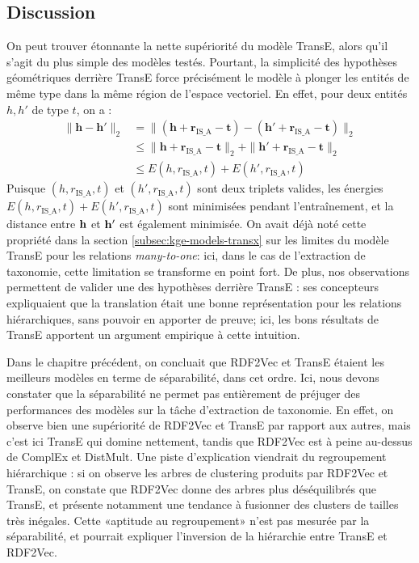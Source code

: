 \subsection{Discussion}
\label{subsec:te-discussion}


On peut trouver étonnante la nette supériorité du modèle TransE, alors qu'il s'agit du plus simple des modèles testés. Pourtant, la simplicité des hypothèses géométriques derrière TransE force précisément le modèle à plonger les entités de même type dans la même région de l'espace vectoriel. En effet, pour deux entités $h, h'$ de type $t$, on a :
\begin{align*}
    \| \mathbf{h} - \mathbf{h}'\|_2 &= \| (\mathbf{h} + \mathbf{r}_{\text{IS\_A}} - \mathbf{t}) - (\mathbf{h}' + \mathbf{r}_{\text{IS\_A}} - \mathbf{t}) \|_2 \\
        &\leq \| \mathbf{h} + \mathbf{r}_{\text{IS\_A}} - \mathbf{t} \|_2 +  \| \mathbf{h}' + \mathbf{r}_{\text{IS\_A}} - \mathbf{t} \|_2 \\
        &\leq E(h, r_{\text{IS\_A}}, t) + E(h', r_{\text{IS\_A}}, t)
\end{align*}
Puisque $(h, r_{\text{IS\_A}}, t)$ et $(h', r_{\text{IS\_A}}, t)$ sont deux triplets valides, les énergies $E(h, r_{\text{IS\_A}}, t) + E(h', r_{\text{IS\_A}}, t)$ sont minimisées pendant l'entraînement, et la distance entre $\bf{h}$ et $\bf{h'}$ est également minimisée. 
On avait déjà noté cette propriété dans la section \ref{subsec:kge-models-transx} sur les limites du modèle TransE pour les relations \textit{many-to-one}: ici, dans le cas de l'extraction de taxonomie, cette limitation se transforme en point fort. De plus, nos observations permettent de valider une des hypothèses derrière TransE : ses concepteurs expliquaient que la translation était une bonne représentation pour les relations hiérarchiques, sans pouvoir en apporter de preuve; ici, les bons résultats de TransE apportent un argument empirique à cette intuition.

Dans le chapitre précédent, on concluait que RDF2Vec et TransE étaient les meilleurs modèles en terme de séparabilité, dans cet ordre. Ici, nous devons constater que la séparabilité ne permet pas entièrement de préjuger des performances des modèles sur la tâche d'extraction de taxonomie. En effet, on observe bien une supériorité de RDF2Vec et TransE par rapport aux autres, mais c'est ici TransE qui domine nettement, tandis que RDF2Vec est à peine au-dessus de ComplEx et DistMult. Une piste d'explication viendrait du regroupement hiérarchique : si on observe les arbres de clustering produits par RDF2Vec et TransE, on constate que RDF2Vec donne des arbres plus déséquilibrés que TransE, et présente notamment une tendance à fusionner des clusters de tailles très inégales. Cette «aptitude au regroupement» n'est pas mesurée par la séparabilité, et pourrait expliquer l'inversion de la hiérarchie entre TransE et RDF2Vec. 

